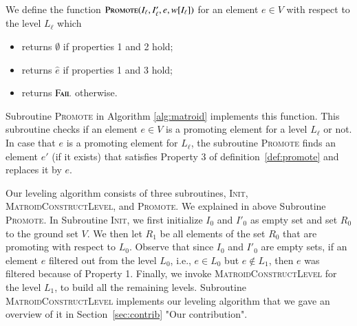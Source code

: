 \documentclass[11pt]{article}
\newcommand{\err}{{\textsc{Fail}}}
\newcommand{\init}{\textsc{Init}}
\newcommand{\MatroidConstLevel}{\textsc{MatroidConstructLevel}}
\newcommand{\replacementTester}{\textsc{Promote}}
\begin{document}
We define the function 
$\replacementTester(I_{\ell}, I'_{\ell}, e, w[I_{\ell}])$ for an element $e \in V$ 
with respect to the level $L_{\ell}$ which 
\begin{itemize}
    \item returns $\emptyset$ if properties 1 and 2 hold; 
    \item returns $\hat{e}$ if properties 1 and 3 hold;
    \item returns $\err$ otherwise.
\end{itemize}

Subroutine \replacementTester{} in Algorithm \ref{alg:matroid} implements this function. 
This subroutine checks if an element $e \in V$ is a promoting element for a level $L_{\ell}$ or not.  
In case that $e$ is a promoting element for $L_{\ell}$, the subroutine \replacementTester{} finds 
an element $e'$ (if it exists) that satisfies Property 3 of definition~\ref{def:promote} and replaces it by $e$. 

Our leveling algorithm consists of three subroutines, \init{}, \MatroidConstLevel{}, and \replacementTester{}. 
We explained in above Subroutine \replacementTester{}. 
In Subroutine \init{}, we first initialize $I_{0}$ and $I'_0$ as empty set and set $R_0$ to the ground set $V$.
We then let $R_1$ be all elements of the set $R_0$ that are promoting  with respect to $L_0$. 
Observe that since $I_0 $ and $I'_0$ are empty sets, 
if an element $e$ 
filtered out from the level $L_0$, 
i.e., $e\in L_0$ but $e\notin L_1$, then
$e$ was filtered
because of Property 1.
Finally, we invoke \MatroidConstLevel{} for the level $L_1$, to build all the remaining levels.
Subroutine \MatroidConstLevel{} implements our leveling algorithm 
that we gave an overview of it in Section~\ref{sec:contrib} "Our contribution". 
\end{document}
